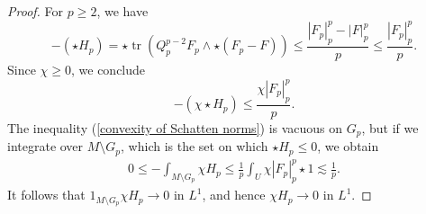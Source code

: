 \documentclass[reqno,11pt]{amsart}
\DeclareMathOperator{\tr}{tr}
\theoremstyle{definition}
\numberwithin{equation}{section}
\begin{document}
\begin{proof}
For $p \geq 2$, we have \cite[Proposition 2.3]{daskalopoulos2022analytic}
$$-(\star H_p) = \star \tr(Q_p^{p - 2} F_p \wedge \star (F_p - F)) \leq \frac{|F_p|_p^p - |F|_p^p}{p} \leq \frac{|F_p|_p^p}{p}.$$
Since $\chi \geq 0$, we conclude 
\begin{equation}\label{convexity of Schatten norms}
-(\chi \star H_p) \leq \frac{\chi |F_p|_p^p}{p}.
\end{equation}
The inequality (\ref{convexity of Schatten norms}) is vacuous on $G_p$, but if we integrate over $M \setminus G_p$, which is the set on which $\star H_p \leq 0$, we obtain
\begin{align*}
0 \leq -\int_{M \setminus G_p} \chi H_p \leq \frac{1}{p} \int_U \chi |F_p|_p^p \star 1 \lesssim \frac{1}{p}.
\end{align*}
It follows that $1_{M \setminus G_p} \chi H_p \to 0$ in $L^1$, and hence $\chi H_p \to 0$ in $L^1$.
\end{proof}
\end{document}
